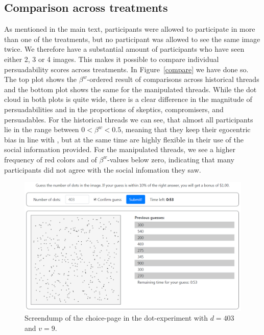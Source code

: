 \documentclass[9pt,a4paper,twocolumn,lineno]{article}
\begin{document}
\subsection*{Comparison across treatments}
As mentioned in the main text, participants were allowed to participate in more than one of the treatments, but no participant was allowed to see the same image twice. We therefore have a substantial amount of participants who have seen either 2, 3 or 4 images. This makes it possible to compare individual persuadability scores across treatments. In Figure~\ref{compare} we have done so. The top plot shows the $\beta^w$-ordered result of comparisons across historical threads and the bottom plot shows the same for the manipulated threads. While the dot cloud in both plots is quite wide, there is a clear difference in the magnitude of persuadabilities and in the proportions of skeptics, compromisers, and persuadables. For the historical threads we can see, that almost all participants lie in the range between $0 < \beta^w < 0.5$, meaning that they keep their egocentric bias in line with \cite{rader2017advice}, but at the same time are highly flexible in their use of the social information provided. For the manipulated threads, we see a higher frequency of red colors and of $\beta^w$-values below zero, indicating that many participants did not agree with the social infomation they saw.  

\newpage

\begin{figure}
\centering
\includegraphics[width=.8\textwidth]{../Screenshots/FigS1.png}
\caption{Screendump of the choice-page in the dot-experiment with $d=403$ and $v=9$.}
\label{fig:S1}
\end{figure}
\end{document}
